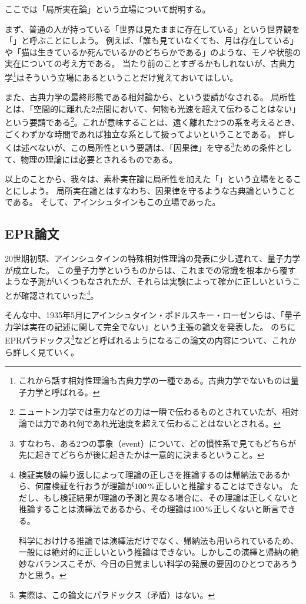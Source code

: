 \documentclass[10pt,b5paper,papersize,dvipdfmx]{jsbook}
\begin{document}
ここでは「局所実在論」という立場について説明する。
\par
まず、普通の人が持っている「世界は見たままに存在している」という世界観を「」と呼ぶことにしよう。
例えば、「誰も見ていなくても、月は存在している」や「猫は生きているか死んでいるかのどちらかである」のような、モノや状態の実在についての考え方である。
当たり前のことすぎるかもしれないが、古典力学\footnote{
  これから話す相対性理論も古典力学の一種である。古典力学でないものは量子力学と呼ばれる。
}はそういう立場にあるということだけ覚えておいてほしい。
\par
また、古典力学の最終形態である相対論から、という要請がなされる。
局所性とは、「空間的に離れた2点間において、何物も光速を超えて伝わることはない」という要請である\footnote{
  ニュートン力学では重力などの力は一瞬で伝わるものとされていたが、相対論では力であれ何であれ光速度を超えて伝わることはないとされる。
}。これが意味することは、遠く離れた2つの系を考えるとき、ごくわずかな時間であれば独立な系として扱ってよいということである。
詳しくは述べないが、この局所性という要請は、「因果律」を守る\footnote{
  すなわち、ある2つの事象（event）について、どの慣性系で見てもどちらが先に起きてどちらが後に起きたかは一意的に決まるということ。
}ための条件として、物理の理論には必要とされるものである。
\par
以上のことから、我々は、素朴実在論に局所性を加えた「」という立場をとることにしよう。
局所実在論とはすなわち、因果律を守るような古典論ということである。
そして、アインシュタインもこの立場であった。


%
\subsection{EPR論文} %
%

20世期初頭、アインシュタインの特殊相対性理論の発表に少し遅れて、量子力学が成立した。
この量子力学というものからは、これまでの常識を根本から覆すような予測がいくつもなされたが、それらは実験によって確かに正しいということが確認されていった\footnote{
  検証実験の繰り返しによって理論の正しさを推論するのは帰納法であるから、何度検証を行おうが理論が$100\tani{\%}$正しいと推論することはできない。
  ただし、もし検証結果が理論の予測と異なる場合に、その理論は正しくないと推論することは演繹法であるから、その理論は$100\tani{\%}$正しくないと断言できる。\par
  科学におけける推論では演繹法だけでなく、帰納法も用いられているため、一般には絶対的に正しいという推論はできない。しかしこの演繹と帰納の絶妙なバランスこそが、今日の目覚ましい科学の発展の要因のひとつであろうかと思う。
}。
\par
そんな中、1935年5月にアインシュタイン・ポドルスキー・ローゼンらは、「量子力学は実在の記述に関して完全でない」という主張の論文を発表した。
のちにEPRパラドックス\footnote{
  実際は、この論文にパラドックス（矛盾）はない。
}などと呼ばれるようになるこの論文の内容について、これから詳しく見ていく。
\end{document}
